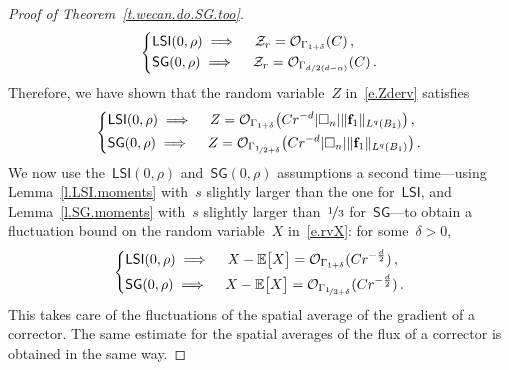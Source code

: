 \documentclass[11pt,twoside]{article} %
\let\oldsquare\square %
\renewcommand{\square}{\oldsquare}
\numberwithin{equation}{section}
\theoremstyle{definition}
\let\originalleft\left
\let\originalright\right
\renewcommand{\left}{\mathopen{}\mathclose\bgroup\originalleft}
\renewcommand{\right}{\aftergroup\egroup\originalright}
\newcommand{\f}{\mathbf{f}}
\newcommand{\cu}{\square}
\newcommand{\E}{\mathbb{E}}
\renewcommand{\O}{\mathcal{O}}
\newcommand{\LSI}{\mathsf{LSI}}
\newcommand{\SG}{\mathsf{SG}}
\begin{document}
\begin{proof}[{Proof of Theorem~\ref{t.wecan.do.SG.too}}]
\begin{equation*}
\left\{
\begin{aligned}
& \LSI(0,\rho) 
\implies \quad 
\mathcal{Z}_r = \O_{\Gamma_{1+\delta}}(C)\,, \\
& 
\SG(0,\rho) 
\implies \quad 
\mathcal{Z}_r
= 
\O_{\Gamma_{d/2(d-\alpha)}}(C)\,.
\end{aligned}
\right.
\end{equation*}
Therefore, we have shown that the random variable~$Z$ in~\eqref{e.Zderv} satisfies
\begin{equation*}
\left\{
\begin{aligned}
& \LSI(0,\rho) 
\implies \quad 
Z = \O_{\Gamma_{1+\delta}}
\bigl(Cr^{-d} |\cu_n| \| \f_1\|_{L^q(B_1)}\bigr)
\,, \\
& 
\SG(0,\rho) 
\implies \quad 
Z = \O_{\Gamma_{\nicefrac12+\delta}}
\bigl(Cr^{-d} |\cu_n| \| \f_1\|_{L^q(B_1)}\bigr)
\,.
\end{aligned}
\right.
\end{equation*}
We now use the~$\LSI(0,\rho)$ and~$\SG(0,\rho)$ assumptions a second time---using Lemma~\ref{l.LSI.moments} with~$s$ slightly larger than the one for~$\LSI$, and Lemma~\ref{l.SG.moments} with~$s$ slightly larger than~$\nicefrac13$ for~$\SG$---to obtain a fluctuation bound on the random variable~$X$ in~\eqref{e.rvX}: for some~$\delta>0$, 
\begin{equation*}
\left\{
\begin{aligned}
& \LSI(0,\rho) 
\implies \quad 
X - \E \bigl[ X \bigr] = \O_{\Gamma_{1+\delta}}(Cr^{-\frac d2})
\,, \\
& 
\SG(0,\rho) 
\implies \quad 
X - \E \bigl[ X \bigr] = \O_{\Gamma_{\nicefrac13+\delta}}(Cr^{-\frac d2})
\,.
\end{aligned}
\right.
\end{equation*}
This takes care of the fluctuations of the spatial average of the gradient of a corrector. The same estimate for the spatial averages of the flux of a corrector is obtained in the same way.

\smallskip


\end{proof}
\end{document}
